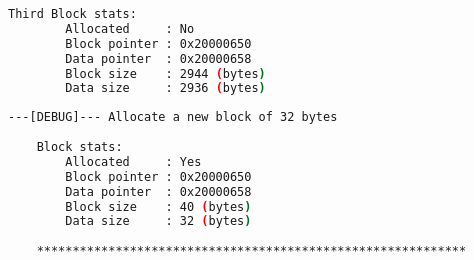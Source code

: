     \begin{outputbox}
    \begin{lstlisting}[language=bash]
    Third Block stats:
        Allocated     : No
        Block pointer : 0x20000650
        Data pointer  : 0x20000658
        Block size    : 2944 (bytes)
        Data size     : 2936 (bytes)
    \end{lstlisting}
    \end{outputbox}
    
    \begin{outputbox}
    \begin{lstlisting}[language=bash]
    ---[DEBUG]--- Allocate a new block of 32 bytes
    
    Block stats:
        Allocated     : Yes
        Block pointer : 0x20000650
        Data pointer  : 0x20000658
        Block size    : 40 (bytes)
        Data size     : 32 (bytes)
    
    ************************************************************
    \end{lstlisting}
    \end{outputbox}